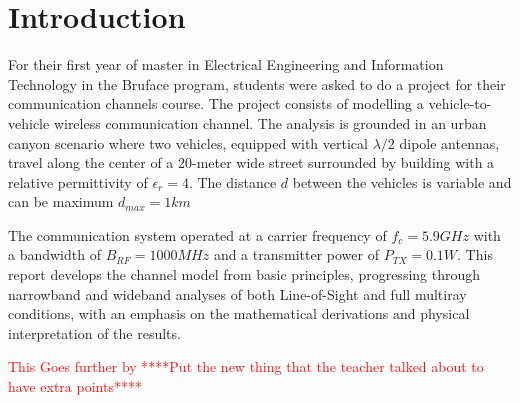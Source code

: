 \setcounter{secnumdepth}{-1}
\chapter{Introduction}
For their first year of master in Electrical Engineering and Information Technology in the Bruface program, students were asked to do a project for their communication channels course. The project consists of modelling a vehicle-to-vehicle wireless communication channel. The analysis is grounded in an urban canyon scenario where two vehicles, equipped with vertical $\lambda/2$ dipole antennas, travel along the center of a 20-meter wide street surrounded by building with a relative permittivity of $\epsilon_r=4$. The distance $d$ between the vehicles is variable and can be maximum $d_{max} = 1 km$

The communication system operated at a carrier frequency of $f_c = 5.9 GHz$ with a bandwidth of $B_{RF} = 1000 MHz$ and a transmitter power of $P_{TX} = 0.1 W$. This report develops the channel model from basic principles, progressing through narrowband and wideband analyses of both Line-of-Sight and full multiray conditions, with an emphasis on the mathematical derivations and physical interpretation of the results.

\textcolor{red}{This Goes further by ****Put the new thing that the teacher talked about to have extra points****}
